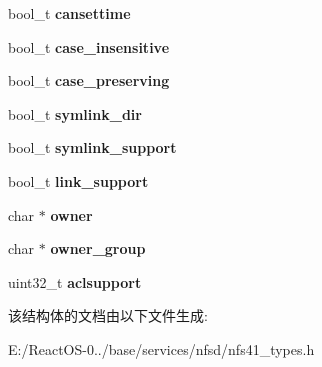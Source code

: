 \begin{DoxyCompactItemize}
bool\+\_\+t {\bfseries cansettime}
\item 
\mbox{\label{struct____nfs41__file__info_a4926d01ae65bcc70fc6f729981911f65}} 
bool\+\_\+t {\bfseries case\+\_\+insensitive}
\item 
\mbox{\label{struct____nfs41__file__info_aa83e91630a587e596272d3abda3cef74}} 
bool\+\_\+t {\bfseries case\+\_\+preserving}
\item 
\mbox{\label{struct____nfs41__file__info_a64aad74fcdbd69255d7dc46d7179f53a}} 
bool\+\_\+t {\bfseries symlink\+\_\+dir}
\item 
\mbox{\label{struct____nfs41__file__info_a50d8fa9c51b66d412052e2842b1bdfcd}} 
bool\+\_\+t {\bfseries symlink\+\_\+support}
\item 
\mbox{\label{struct____nfs41__file__info_a8ac1a65a5f4285ad3ae87efbd1ecfb93}} 
bool\+\_\+t {\bfseries link\+\_\+support}
\item 
\mbox{\label{struct____nfs41__file__info_a03e28f4cc0bbf321c70bf8f31faa3451}} 
char $\ast$ {\bfseries owner}
\item 
\mbox{\label{struct____nfs41__file__info_ae1694fd94dddbd31f0421599848a6f46}} 
char $\ast$ {\bfseries owner\+\_\+group}
\item 
\mbox{\label{struct____nfs41__file__info_a9af14a1d32ab8e729e993f2fe7434676}} 
uint32\+\_\+t {\bfseries aclsupport}
\end{DoxyCompactItemize}


该结构体的文档由以下文件生成\+:\begin{DoxyCompactItemize}
\item 
E\+:/\+React\+O\+S-\/0../base/services/nfsd/nfs41\+\_\+types.\+h\end{DoxyCompactItemize}
